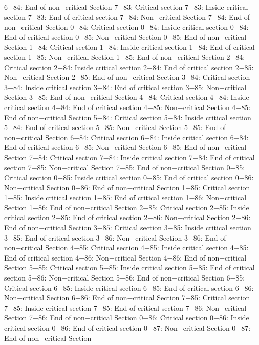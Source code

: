 6−84: End of non−critical Section
7−83: Critical section
7−83: Inside critical section
7−83: End of critical section
7−84: Non−critical Section
7−84: End of non−critical Section
0−84: Critical section
0−84: Inside critical section
0−84: End of critical section
0−85: Non−critical Section
0−85: End of non−critical Section
1−84: Critical section
1−84: Inside critical section
1−84: End of critical section
1−85: Non−critical Section
1−85: End of non−critical Section
2−84: Critical section
2−84: Inside critical section
2−84: End of critical section
2−85: Non−critical Section
2−85: End of non−critical Section
3−84: Critical section
3−84: Inside critical section
3−84: End of critical section
3−85: Non−critical Section
3−85: End of non−critical Section
4−84: Critical section
4−84: Inside critical section
4−84: End of critical section
4−85: Non−critical Section
4−85: End of non−critical Section
5−84: Critical section
5−84: Inside critical section
5−84: End of critical section
5−85: Non−critical Section
5−85: End of non−critical Section
6−84: Critical section
6−84: Inside critical section
6−84: End of critical section
6−85: Non−critical Section
6−85: End of non−critical Section
7−84: Critical section
7−84: Inside critical section
7−84: End of critical section
7−85: Non−critical Section
7−85: End of non−critical Section
0−85: Critical section
0−85: Inside critical section
0−85: End of critical section
0−86: Non−critical Section
0−86: End of non−critical Section
1−85: Critical section
1−85: Inside critical section
1−85: End of critical section
1−86: Non−critical Section
1−86: End of non−critical Section
2−85: Critical section
2−85: Inside critical section
2−85: End of critical section
2−86: Non−critical Section
2−86: End of non−critical Section
3−85: Critical section
3−85: Inside critical section
3−85: End of critical section
3−86: Non−critical Section
3−86: End of non−critical Section
4−85: Critical section
4−85: Inside critical section
4−85: End of critical section
4−86: Non−critical Section
4−86: End of non−critical Section
5−85: Critical section
5−85: Inside critical section
5−85: End of critical section
5−86: Non−critical Section
5−86: End of non−critical Section
6−85: Critical section
6−85: Inside critical section
6−85: End of critical section
6−86: Non−critical Section
6−86: End of non−critical Section
7−85: Critical section
7−85: Inside critical section
7−85: End of critical section
7−86: Non−critical Section
7−86: End of non−critical Section
0−86: Critical section
0−86: Inside critical section
0−86: End of critical section
0−87: Non−critical Section
0−87: End of non−critical Section
